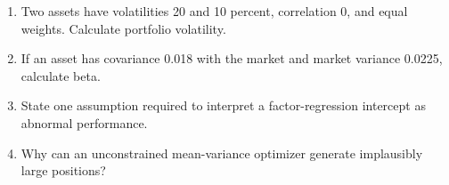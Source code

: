 \begin{exerciseblock}
\begin{enumerate}
  \item Two assets have volatilities 20 and 10 percent, correlation 0, and equal weights. Calculate portfolio volatility.
  \item If an asset has covariance 0.018 with the market and market variance 0.0225, calculate beta.
  \item State one assumption required to interpret a factor-regression intercept as abnormal performance.
  \item Why can an unconstrained mean-variance optimizer generate implausibly large positions?
\end{enumerate}
\end{exerciseblock}
